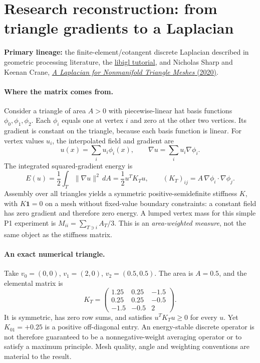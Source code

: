 \clearpage
\section*{Research reconstruction: from triangle gradients to a Laplacian}
\noindent\textbf{Primary lineage:} the finite-element/cotangent discrete
Laplacian described in geometric processing literature, the
\href{https://libigl.github.io/tutorial/}{libigl tutorial}, and
Nicholas Sharp and Keenan Crane,
\href{https://www.cs.cmu.edu/~kmcrane/Projects/NonmanifoldLaplace/index.html}
{\emph{A Laplacian for Nonmanifold Triangle Meshes} (2020)}.

\paragraph{Where the matrix comes from.}
Consider a triangle of area \(A>0\) with piecewise-linear hat
basis functions \(\phi_0,\phi_1,\phi_2\). Each \(\phi_i\) equals one
at vertex \(i\) and zero at the other two vertices. Its gradient is
constant on the triangle, because each basis function is linear.
For vertex values \(u_i\), the interpolated field and gradient are
\[
u(x)=\sum_i u_i\phi_i(x), \qquad
\nabla u=\sum_i u_i\nabla\phi_i.
\]
The integrated squared-gradient energy is
\[
E(u)=\frac12\int_T\lVert\nabla u\rVert^2\,dA
=\frac12u^TK_Tu,\qquad
(K_T)_{ij}=A\,\nabla\phi_i\cdot\nabla\phi_j.
\]
Assembly over all triangles yields a symmetric
positive-semidefinite stiffness \(K\), with \(K\mathbf 1=0\)
on a mesh without fixed-value boundary constraints: a constant
field has zero gradient and therefore zero energy. A lumped
vertex mass for this simple P1 experiment is
\(M_{ii}=\sum_{T\ni i}A_T/3\).
This is an \emph{area-weighted measure}, not the same object as
the stiffness matrix.

\paragraph{An exact numerical triangle.}
Take \(v_0=(0,0)\), \(v_1=(2,0)\), \(v_2=(0.5,0.5)\).
The area is \(A=0.5\), and the elemental matrix is
\[
K_T=
\begin{pmatrix}
1.25&0.25&-1.5\\
0.25&0.25&-0.5\\
-1.5&-0.5&2
\end{pmatrix}.
\]
It is symmetric, has zero row sums, and satisfies
\(u^TK_Tu\ge0\) for every \(u\).
Yet \(K_{01}=+0.25\) is a positive off-diagonal entry. An
energy-stable discrete operator is not therefore guaranteed to
be a nonnegative-weight averaging operator or to satisfy a
maximum principle. Mesh quality, angle and weighting conventions
are material to the result.

